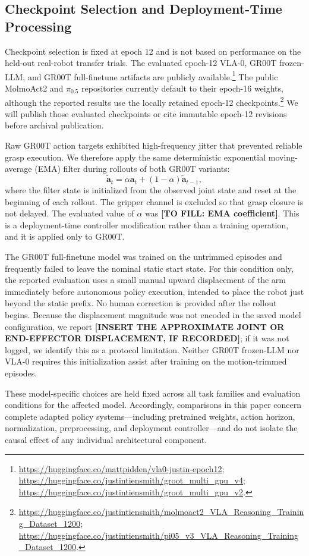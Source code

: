 \subsection{Checkpoint Selection and Deployment-Time Processing}

Checkpoint selection is fixed at epoch 12 and is not based on performance on the held-out real-robot transfer trials. The evaluated epoch-12 VLA-0, GR00T frozen-LLM, and GR00T full-finetune artifacts are publicly available.\footnote{\url{https://huggingface.co/mattpidden/vla0-justin-epoch12}; \url{https://huggingface.co/justintiensmith/groot_multi_gpu_v4}; \url{https://huggingface.co/justintiensmith/groot_multi_gpu_v2}.} The public MolmoAct2 and $\pi_{0.5}$ repositories currently default to their epoch-16 weights, although the reported results use the locally retained epoch-12 checkpoints.\footnote{\url{https://huggingface.co/justintiensmith/molmoact2_VLA_Reasoning_Training_Dataset_1200}; \url{https://huggingface.co/justintiensmith/pi05_v3_VLA_Reasoning_Training_Dataset_1200}.} We will publish those evaluated checkpoints or cite immutable epoch-12 revisions before archival publication.

Raw GR00T action targets exhibited high-frequency jitter that prevented reliable grasp execution. We therefore apply the same deterministic exponential moving-average (EMA) filter during rollouts of both GR00T variants:
\begin{equation}
    \widetilde{\mathbf{a}}_t
    = \alpha\mathbf{a}_t + (1-\alpha)\widetilde{\mathbf{a}}_{t-1},
\end{equation}
where the filter state is initialized from the observed joint state and reset at the beginning of each rollout. The gripper channel is excluded so that grasp closure is not delayed. The evaluated value of $\alpha$ was \textbf{[TO FILL: EMA coefficient]}. This is a deployment-time controller modification rather than a training operation, and it is applied only to GR00T.

The GR00T full-finetune model was trained on the untrimmed episodes and frequently failed to leave the nominal static start state. For this condition only, the reported evaluation uses a small manual upward displacement of the arm immediately before autonomous policy execution, intended to place the robot just beyond the static prefix. No human correction is provided after the rollout begins. Because the displacement magnitude was not encoded in the saved model configuration, we report \textbf{[INSERT THE APPROXIMATE JOINT OR END-EFFECTOR DISPLACEMENT, IF RECORDED]}; if it was not logged, we identify this as a protocol limitation. Neither GR00T frozen-LLM nor VLA-0 requires this initialization assist after training on the motion-trimmed episodes.

These model-specific choices are held fixed across all task families and evaluation conditions for the affected model. Accordingly, comparisons in this paper concern complete adapted policy systems---including pretrained weights, action horizon, normalization, preprocessing, and deployment controller---and do not isolate the causal effect of any individual architectural component.
